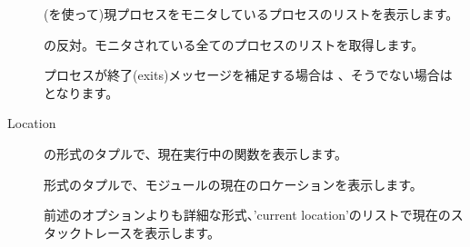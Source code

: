 \begin{description*}
\begin{description}
			\item[] (を使って)現プロセスをモニタしているプロセスのリストを表示します。

			\item[] の反対。モニタされている全てのプロセスのリストを取得します。

			\item[] プロセスが終了(exits)メッセージを補足する場合は 、そうでない場合は となります。

		\end{description}		
	\item[Location] \hfill
		\begin{description}
			\item[] の形式のタプルで、現在実行中の関数を表示します。

			\item[] 形式のタプルで、モジュールの現在のロケーションを表示します。

			\item[] 前述のオプションよりも詳細な形式、'current location'のリストで現在のスタックトレースを表示します。


\end{description}
\end{description*}
